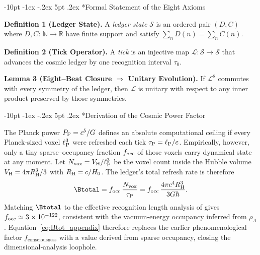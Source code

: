\documentclass[12pt,letterpaper]{book}
\makeatletter
\renewcommand\section{\@startsection{section}{1}{\z@}%
  {-8pt \@plus -1ex \@minus -.2ex}%
  {4pt \@plus.2ex}%
  {\normalfont\large\bfseries}}
\renewcommand\section{\@startsection {section}{1}{\z@}%
                {-10pt \@plus -1ex \@minus -.2ex}%
                {5pt \@plus.2ex}%
                {\normalfont\large\bfseries}}
\makeatother
\begin{document}
\section*{Formal Statement of the Eight Axioms}
\textbf{Definition 1 (Ledger State).}\label{def:ledgerstate}
A \emph{ledger state} $\mathcal S$ is an ordered pair $(D,C)$ where $D,C:\,\mathbb N\to\mathbb R$ have finite support and satisfy $\sum_n D(n)=\sum_n C(n)$.

\textbf{Definition 2 (Tick Operator).}\label{def:tick}
A \emph{tick} is an injective map $\mathcal L: \mathcal S\to\mathcal S$ that advances the cosmic ledger by one recognition interval $\tau_0$.

\textbf{Lemma 3 (Eight–Beat Closure $\Rightarrow$ Unitary Evolution).}\label{lem:eightbeat}
If $\mathcal L^8$ commutes with every symmetry of the ledger, then $\mathcal L$ is unitary with respect to any inner product preserved by those symmetries.


\section*{Derivation of the Cosmic Power Factor}
The Planck power $P_{\rm P}=c^{5}/G$ defines an absolute computational ceiling if every Planck‐sized voxel $\ell_{\rm P}^{3}$ were refreshed each tick $\tau_{\rm P}=\ell_{\rm P}/c$.  Empirically, however, only a tiny sparse–occupancy fraction $f_{\rm occ}$ of those voxels carry dynamical state at any moment.  Let $N_{\rm vox}=V_{\rm H}/\ell_{\rm P}^{3}$ be the voxel count inside the Hubble volume $V_{\rm H}=4\pi R_{\rm H}^{3}/3$ with $R_{\rm H}=c/H_{0}$.  The ledger's total refresh rate is therefore
\begin{equation}
\label{eq:Btot_appendix}
 \Btotal = f_{\rm occ}\,\frac{N_{\rm vox}}{\tau_{\rm P}} = f_{\rm occ}\,\frac{4\pi c^{4} R_{\rm H}^{3}}{3 G \hbar} .
\end{equation}
Matching $\Btotal$ to the effective recognition length analysis of \citet{Washburn2024} gives $f_{\rm occ}\simeq3\times10^{-122}$, consistent with the vacuum‐energy occupancy inferred from $\rho_{\Lambda}$.  Equation~\eqref{eq:Btot_appendix} therefore replaces the earlier phenomenological factor $f_{\text{consciousness}}$ with a value derived from sparse occupancy, closing the dimensional‐analysis loophole.
\end{document}
